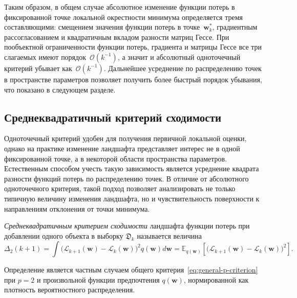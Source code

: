 Таким образом, в общем случае абсолютное изменение функции потерь в фиксированной точке локальной окрестности минимума определяется тремя составляющими: смещением значения функции потерь в точке~$\mathbf w_k^*$, градиентным рассогласованием и квадратичным вкладом разности матриц Гессе. При пообъектной ограниченности функции потерь, градиента и матрицы Гессе все три слагаемых имеют порядок~$\mathcal O(k^{-1})$, а значит и абсолютный одноточечный критерий убывает как~$\mathcal O(k^{-1})$. Дальнейшее усреднение по распределению точек в пространстве параметров позволяет получить более быстрый порядок убывания, что показано в следующем разделе.

\subsection{Среднеквадратичный критерий сходимости}\label{subsec:squared}

Одноточечный критерий удобен для получения первичной локальной оценки, однако на практике изменение ландшафта представляет интерес не в одной фиксированной точке, а в некоторой области пространства параметров. Естественным способом учесть такую зависимость является усреднение квадрата разности функций потерь по распределению точек. В отличие от абсолютного одноточечного критерия, такой подход позволяет анализировать не только типичную величину изменения ландшафта, но и чувствительность поверхности к направлениям отклонения от точки минимума.

\begin{definition}
    \emph{Среднеквадратичным критерием сходимости} ландшафта функции потерь при добавлении одного объекта в выборку $\mathfrak{D}_{k}$ называется величина
    \begin{equation}
        \label{eq:squared-criterion}
        \Delta_{2}(k+1) = \int \big(\mathcal{L}_{k+1}(\mathbf{w}) - \mathcal{L}_{k}(\mathbf{w})\big)^2 q(\mathbf{w}) d\mathbf{w} = \mathbb{E}_{q(\mathbf{w})} \left[ \big( \mathcal{L}_{k+1}(\mathbf{w}) - \mathcal{L}_{k}(\mathbf{w}) \big)^2 \right].
    \end{equation}
\end{definition}

\begin{remark}
    Определение является частным случаем общего критерия~\eqref{eq:general-p-criterion} при $p=2$ и произвольной функции предпочтения $q(\mathbf{w})$, нормированной как плотность вероятностного распределения.
\end{remark}

